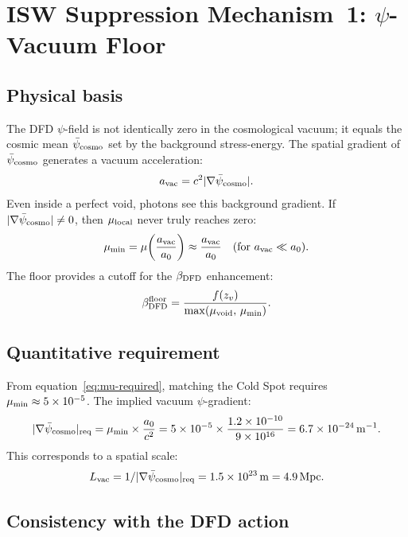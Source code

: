 \documentclass[11pt]{article}
\newcommand{\ee}[1]{\times 10^{#1}}
\newcommand{\mufd}{\mu}
\newcommand{\DFD}{{\rm DFD}}
\newcommand{\mumin}{\mu_{\rm min}}
\newcommand{\psibar}{\bar{\psi}_{\rm cosmo}}
\begin{document}
\section{ISW Suppression Mechanism~1: $\psi$-Vacuum Floor}
\label{sec:mechanism1-vacuum-floor}

\subsection{Physical basis}

The DFD $\psi$-field is not identically zero in the cosmological vacuum;
it equals the cosmic mean $\psibar$ set by the background stress-energy.
The spatial gradient of $\psibar$ generates a vacuum acceleration:
\begin{equation}
  a_{\rm vac} = c^2|\nabla\psibar|.
\end{equation}
Even inside a perfect void, photons see this background gradient.
If $|\nabla\psibar| \neq 0$, then $\mu_{\rm local}$ never truly
reaches zero:
\begin{equation}\label{eq:vacuum-floor}
  \mumin = \mu\!\left(\frac{a_{\rm vac}}{a_0}\right)
  \approx \frac{a_{\rm vac}}{a_0}
  \quad (\text{for }a_{\rm vac} \ll a_0).
\end{equation}
The floor provides a cutoff for the $\beta_{\DFD}$ enhancement:
\begin{equation}
  \beta_{\DFD}^{\rm floor} = \frac{f(z_v)}{\max(\mufd_{\rm void},\,\mumin)}.
\end{equation}

\subsection{Quantitative requirement}

From equation~\eqref{eq:mu-required}, matching the Cold Spot requires
$\mumin \approx 5\ee{-5}$.  The implied vacuum $\psi$-gradient:
\begin{equation}
  |\nabla\psibar|_{\rm req}
  = \mumin\times\frac{a_0}{c^2}
  = 5\ee{-5}\times\frac{1.2\ee{-10}}{9\ee{16}}
  = 6.7\ee{-24}\,{\rm m}^{-1}.
\end{equation}
This corresponds to a spatial scale:
\[
  L_{\rm vac} = 1/|\nabla\psibar|_{\rm req}
  = 1.5\ee{23}\,{\rm m} = 4.9\,{\rm Mpc}.
\]

\subsection{Consistency with the DFD action}
\end{document}
